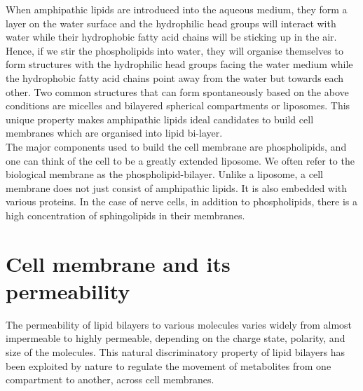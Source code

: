 \documentclass[11pt]{article}
\begin{document}
When amphipathic lipids are introduced into the aqueous medium, they form a layer on the water surface and the hydrophilic head groups will interact with water while their hydrophobic fatty acid chains will be sticking up in the air. Hence, if we stir the phospholipids into water, they will organise themselves to form structures with the hydrophilic head groups facing the water medium while the hydrophobic fatty acid chains point away from the water but towards each other. Two common structures that can form spontaneously based on the above conditions are micelles and bilayered spherical compartments or liposomes. This unique property makes amphipathic lipids ideal candidates to build cell membranes which are organised into lipid bi-layer.
\\[0pt]

The major components used to build the cell membrane are phospholipids, and one can think of the cell to be a greatly extended liposome. We often refer to the biological membrane as the phospholipid-bilayer. Unlike a liposome, a cell membrane does not just consist of amphipathic lipids. It is also embedded with various proteins. In the case of nerve cells, in addition to phospholipids, there is a high concentration of sphingolipids in their membranes.

\section{Cell membrane and its permeability}
\label{sec:org6c52f8c}
The permeability of lipid bilayers to various molecules varies widely from almost impermeable to highly permeable, depending on the charge state, polarity, and size of the molecules. This natural discriminatory property of lipid bilayers has been exploited by nature to regulate the movement of metabolites from one compartment to another, across cell membranes.
\end{document}
